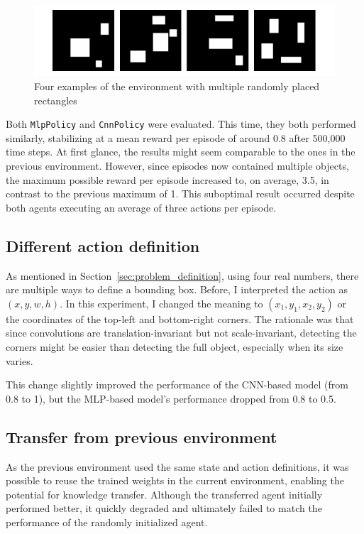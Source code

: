 \documentclass[
  digital,     %
  oneside,     %
  nosansbold,  %
  nocolorbold, %
  lof,         %
  lot,         %
]{fithesis4}
\begin{document}
\begin{figure}
    \includegraphics[width=1\linewidth]{env_examples/env3.pdf}
    \caption{Four examples of the environment with multiple randomly placed rectangles}
    \label{fig:env3}
\end{figure}

Both \texttt{MlpPolicy} and \texttt{CnnPolicy} were evaluated. This time, they both performed similarly, stabilizing at a mean reward per episode of around 0.8 after 500,000 time steps. At first glance, the results might seem comparable to the ones in the previous environment. However, since episodes now contained multiple objects, the maximum possible reward per episode increased to, on average, 3.5, in contrast to the previous maximum of 1. This suboptimal result occurred despite both agents executing an average of three actions per episode.

\subsection{Different action definition}
\label{subsec:different_rect_repr}

As mentioned in Section~\ref{sec:problem_definition}, using four real numbers, there are multiple ways to define a bounding box. Before, I interpreted the action as $(x, y, w, h)$. In this experiment, I changed the meaning to $(x_1, y_1, x_2, y_2)$ or the coordinates of the top-left and bottom-right corners. The rationale was that since convolutions are translation-invariant but not scale-invariant, detecting the corners might be easier than detecting the full object, especially when its size varies.

This change slightly improved the performance of the CNN-based model (from 0.8 to 1), but the MLP-based model's performance dropped from 0.8 to 0.5.

\subsection{Transfer from previous environment}

As the previous environment used the same state and action definitions, it was possible to reuse the trained weights in the current environment, enabling the potential for knowledge transfer. Although the transferred agent initially performed better, it quickly degraded and ultimately failed to match the performance of the randomly initialized agent.
\end{document}
